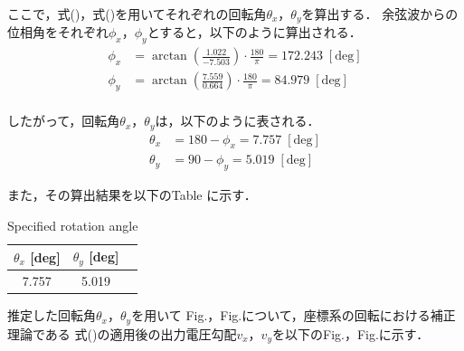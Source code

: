 ここで，式()，式()を用いてそれぞれの回転角$\theta_x$，$\theta_y$を算出する．
余弦波からの位相角をそれぞれ$\phi_x$，$\phi_y$とすると，以下のように算出される．
\begin{align}
	\phi_x &= \arctan \left(\frac{1.022}{-7.503}\right) \cdot \frac{180}{\pi} = 172.243\; [\mathrm{deg}]\\
	\phi_y &= \arctan \left(\frac{7.559}{0.664}\right) \cdot \frac{180}{\pi} = 84.979\; [\mathrm{deg}]\\
\end{align}

したがって，回転角$\theta_x$，$\theta_y$は，以下のように表される．
\begin{align}
	\theta_x &= 180 - \phi_x = 7.757 \; [\mathrm{deg}]\\
	\theta_y &= 90 - \phi_y = 5.019 \; [\mathrm{deg}]
\end{align}

また，その算出結果を以下のTable に示す．

\begin{table}[htbp]
  \begin{center}
      \caption{Specified rotation angle}
      \begin{tabular}{|p{30mm}|p{20mm}|p{20mm}|}
          \hline
          \multicolumn{1}{|c|}{$\theta_x$ [deg]} & \multicolumn{1}{|c|}{$\theta_y$ [deg]} \\ \hline
          \multicolumn{1}{|c|}{7.757}           & \multicolumn{1}{|c|}{5.019}           \\ \hline
      \end{tabular}
  \end{center}
\end{table}

\newpage
推定した回転角$\theta_x$，$\theta_y$を用いて
Fig.，Fig.について，座標系の回転における補正理論である
式()の適用後の出力電圧勾配$v_x$，$v_y$を以下のFig.，Fig.に示す．

